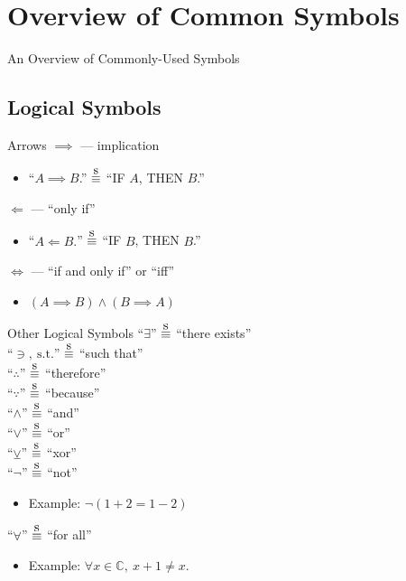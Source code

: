 \documentclass{beamer}
\newcommand{\sequiv}{\stackrel{\mathclap{\normalfont\mbox{s}}}{\equiv}}
\begin{document}
	\section{Overview of Common Symbols}
		\begin{frame}
			\begin{center}
				An Overview of Commonly-Used Symbols
			\end{center}
		\end{frame}
		\subsection{Logical Symbols}
			\begin{frame}{Arrows}
				$\implies$ --- implication\\
				\begin{itemize}
					\item ``$A \implies B$.'' $\sequiv$ ``IF $A$, THEN $B$.''
				\end{itemize}
				$\Longleftarrow$  --- ``only if''\\
				\begin{itemize}
					\item ``$A \Longleftarrow B.$'' $\sequiv$ ``IF $B$, THEN $B$.''
				\end{itemize}
				$\iff$ --- ``if and only if'' or ``iff''
				\begin{itemize}
					\item $\left(A \implies B\right) \land \left(B \implies A\right)$
				\end{itemize}
			\end{frame}
			\begin{frame}{Other Logical Symbols}
				``$\exists$'' $\sequiv$ ``there exists''\\
				``$\ni, \ \textrm{s.t.}$'' $\sequiv$ ``such that''\\
				``$\therefore$'' $\sequiv$ ``therefore''\\
				``$\because$'' $\sequiv$ ``because''\\
				``$\land$'' $\sequiv$ ``and''\\
				``$\lor$'' $\sequiv$ ``or''\\
				``$\veebar$'' $\sequiv$ ``xor''\\
				``$\neg$'' $\sequiv$ ``not''
				\begin{itemize}
					\item Example: $\neg\left(1 + 2 = 1 - 2\right)$
				\end{itemize}
				``$\forall$'' $\sequiv$ ``for all''
				\begin{itemize}
					\item Example: $\forall x \in \mathbb{C}, \ x + 1 \neq x.$
				\end{itemize}
			\end{frame}
\end{document}

